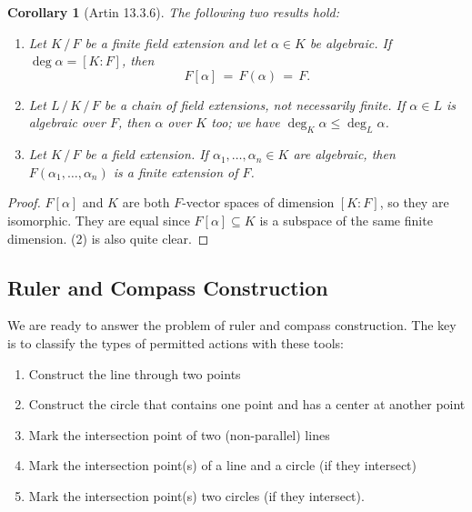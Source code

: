 \documentclass[11pt]{article}
\newtheorem{corollary}{Corollary}
\begin{document}
\begin{adjustwidth}{0.5cm}{}
  \begin{corollary}[Artin 13.3.6]
    The following two results hold:
    \begin{enumerate}
      \item Let $K \, / \, F$ be a finite field extension and let $\alpha \in K$ be algebraic. If $\deg \alpha = [K : F]$, then
      \[
        F[\alpha] \, = \, F(\alpha) \, = \, F.
      \]
      \item Let $L \, / \, K \, / \, F$ be a chain of field extensions, not necessarily finite. If $\alpha \in L$ is algebraic over $F$, then $\alpha$ over $K$ too; we have $\deg_{K} \alpha \le \deg_{L} \alpha$.
      \item Let $K \, / \, F$ be a field extension. If $\alpha_{1}, \ldots, \alpha_{n} \in K$ are algebraic, then $F(\alpha_{1}, \ldots, \alpha_{n})$ is a finite extension of $F$.
    \end{enumerate}
  \end{corollary}
  \begin{proof}
    $F[\alpha]$ and $K$ are both $F$-vector spaces of dimension $[K : F]$, so they are isomorphic. They are equal since $F[\alpha] \subseteq K$ is a subspace of the same finite dimension. (2) is also quite clear.
  \end{proof}
\end{adjustwidth}


\subsection{Ruler and Compass Construction}

We are ready to answer the problem of ruler and compass construction. The key is to classify the types of permitted actions with these tools:
\begin{enumerate}
  \item Construct the line through two points
  \item Construct the circle that contains one point and has a center at another point
  \item Mark the intersection point of two (non-parallel) lines
  \item Mark the intersection point(s) of a line and a circle (if they intersect)
  \item Mark the intersection point(s) two circles (if they intersect).
\end{enumerate}
\end{document}
